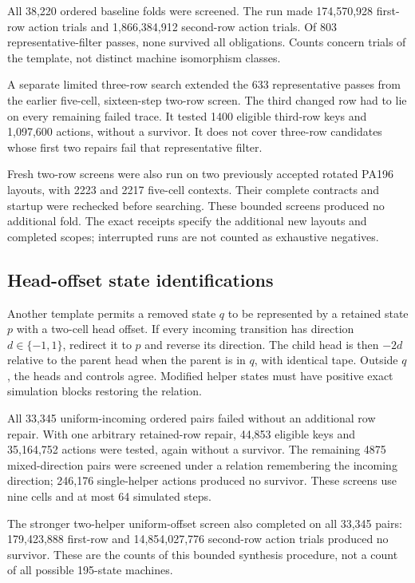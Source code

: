 All 38,220 ordered baseline folds were screened. The run made 174,570,928 first-row action trials and 1,866,384,912 second-row action trials. Of 803 representative-filter passes, none survived all obligations. Counts concern trials of the template, not distinct machine isomorphism classes.

A separate limited three-row search extended the 633 representative passes from the earlier five-cell, sixteen-step two-row screen. The third changed row had to lie on every remaining failed trace. It tested 1400 eligible third-row keys and 1,097,600 actions, without a survivor. It does not cover three-row candidates whose first two repairs fail that representative filter.

Fresh two-row screens were also run on two previously accepted rotated PA196 layouts, with 2223 and 2217 five-cell contexts. Their complete contracts and startup were rechecked before searching. These bounded screens produced no additional fold. The exact receipts specify the additional new layouts and completed scopes; interrupted runs are not counted as exhaustive negatives.

\subsection{Head-offset state identifications}
Another template permits a removed state $q$ to be represented by a retained state $p$ with a two-cell head offset. If every incoming transition has direction $d\in\{-1,1\}$, redirect it to $p$ and reverse its direction. The child head is then $-2d$ relative to the parent head when the parent is in $q$, with identical tape. Outside $q$, the heads and controls agree. Modified helper states must have positive exact simulation blocks restoring the relation.

All 33,345 uniform-incoming ordered pairs failed without an additional row repair. With one arbitrary retained-row repair, 44,853 eligible keys and 35,164,752 actions were tested, again without a survivor. The remaining 4875 mixed-direction pairs were screened under a relation remembering the incoming direction; 246,176 single-helper actions produced no survivor. These screens use nine cells and at most 64 simulated steps.

The stronger two-helper uniform-offset screen also completed on all 33,345 pairs: 179,423,888 first-row and 14,854,027,776 second-row action trials produced no survivor. These are the counts of this bounded synthesis procedure, not a count of all possible 195-state machines.


